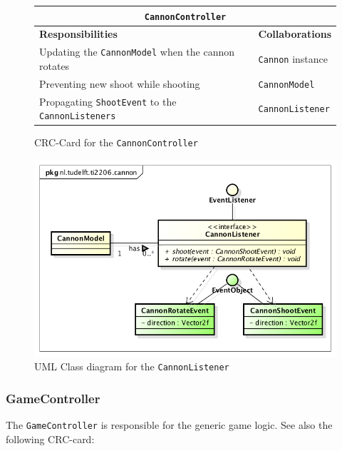 \documentclass[a4paper]{article}
\begin{document}
\begin{figure}[H]
    \begin{center}
    \begin{tabular}{ | p{8cm} | p{4cm} | }
      \multicolumn{2}{c}{\texttt{CannonController}} \\ \hline
      \textbf{Responsibilities} & \textbf{Collaborations} \\ \hline
      Updating the \texttt{CannonModel} when the cannon rotates & \texttt{Cannon} instance \\
      Preventing new shoot while shooting & \texttt{CannonModel} \\
      Propagating \texttt{ShootEvent} to the \texttt{CannonListeners} & \texttt{CannonListener} \\
      \hline
    \end{tabular}
    \end{center}
    \caption{CRC-Card for the \texttt{CannonController}}
\end{figure}

\begin{figure}[H]
    \centering
    \includegraphics[scale=0.5]{CannonListener.png}
    \caption{UML Class diagram for the \texttt{CannonListener}}
\end{figure}

\clearpage
\subsubsection*{GameController}
The \texttt{GameController} is responsible for the generic game logic. See also the following CRC-card:
\end{document}
